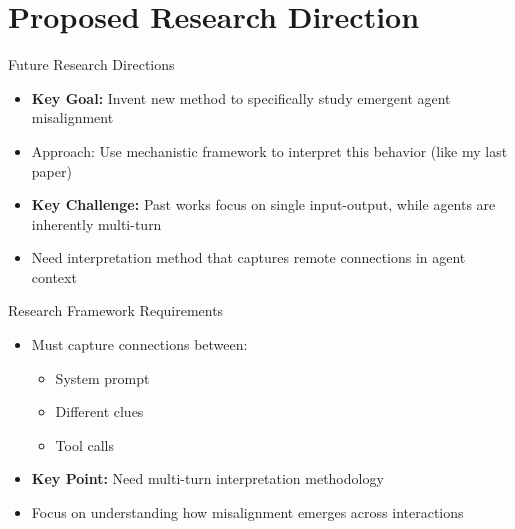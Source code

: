 \documentclass[aspectratio=169,12pt]{beamer}
\begin{document}
\section{Proposed Research Direction}
\begin{frame}{Future Research Directions}
    \begin{itemize}
        \item \textbf{Key Goal:} Invent new method to specifically study emergent agent misalignment
        \item Approach: Use mechanistic framework to interpret this behavior (like my last paper)
        \item \textbf{Key Challenge:} Past works focus on single input-output, while agents are inherently multi-turn
        \item Need interpretation method that captures remote connections in agent context
    \end{itemize}
\end{frame}

\begin{frame}{Research Framework Requirements}
    \begin{itemize}
        \item Must capture connections between:
        \begin{itemize}
            \item System prompt
            \item Different clues
            \item Tool calls
        \end{itemize}
        \item \textbf{Key Point:} Need multi-turn interpretation methodology
        \item Focus on understanding how misalignment emerges across interactions
    \end{itemize}
\end{frame}
\end{document}
